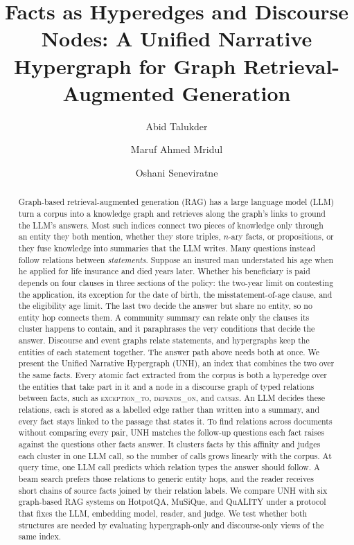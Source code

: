 \documentclass[sigconf, review, anonymous]{acmart}
\newcommand{\sys}{UNH}
\newcommand{\sysfull}{Unified Narrative Hypergraph}
\newcommand{\rel}[1]{\textsc{#1}}            %
\begin{document}
\title{Facts as Hyperedges and Discourse Nodes: A Unified Narrative Hypergraph for Graph Retrieval-Augmented Generation}

\author{Abid Talukder}

\author{Maruf Ahmed Mridul}

\author{Oshani Seneviratne}

\renewcommand{\shortauthors}{Talukder et al.}

\begin{abstract}
Graph-based retrieval-augmented generation (RAG) has a large language model (LLM) turn a corpus into a knowledge graph and retrieves along the graph's links to ground the LLM's answers. Most such indices connect two pieces of knowledge only through an entity they both mention, whether they store triples, $n$-ary facts, or propositions, or they fuse knowledge into summaries that the LLM writes. Many questions instead follow relations between \emph{statements}. Suppose an insured man understated his age when he applied for life insurance and died years later. Whether his beneficiary is paid depends on four clauses in three sections of the policy: the two-year limit on contesting the application, its exception for the date of birth, the misstatement-of-age clause, and the eligibility age limit. The last two decide the answer but share no entity, so no entity hop connects them. A community summary can relate only the clauses its cluster happens to contain, and it paraphrases the very conditions that decide the answer. Discourse and event graphs relate statements, and hypergraphs keep the entities of each statement together. The answer path above needs both at once. We present the \sysfull{} (\sys{}), an index that combines the two over the same facts. Every atomic fact extracted from the corpus is both a hyperedge over the entities that take part in it and a node in a discourse graph of typed relations between facts, such as \rel{exception\_to}, \rel{depends\_on}, and \rel{causes}. An LLM decides these relations, each is stored as a labelled edge rather than written into a summary, and every fact stays linked to the passage that states it. To find relations across documents without comparing every pair, \sys{} matches the follow-up questions each fact raises against the questions other facts answer. It clusters facts by this affinity and judges each cluster in one LLM call, so the number of calls grows linearly with the corpus. At query time, one LLM call predicts which relation types the answer should follow. A beam search prefers those relations to generic entity hops, and the reader receives short chains of source facts joined by their relation labels. We compare \sys{} with six graph-based RAG systems on HotpotQA, MuSiQue, and QuALITY under a protocol that fixes the LLM, embedding model, reader, and judge. We test whether both structures are needed by evaluating hypergraph-only and discourse-only views of the same index.

\end{abstract}
\end{document}
